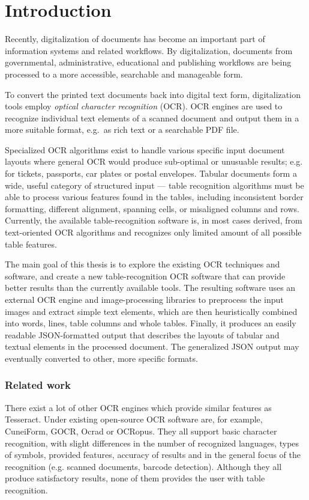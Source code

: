 \chapter*{Introduction}

Recently, digitalization of documents has become an important part of information systems and related workflows. By digitalization, documents from governmental, administrative, educational and publishing workflows are being processed to a more accessible, searchable and manageable form.

To convert the printed text documents back into digital text form, digitalization tools employ \emph{optical character recognition} (OCR). OCR engines are used to recognize individual text elements of a scanned document and output them in a more suitable format, e.g.~as rich text or a searchable PDF file.

Specialized OCR algorithms exist to handle various specific input document layouts where general OCR would produce sub-optimal or unusuable results; e.g. for tickets, passports, car plates or postal envelopes. Tabular documents form a wide, useful category of structured input --- table recognition algorithms must be able to process various features found in the tables, including inconsistent border formatting, different alignment, spanning cells, or misaligned columns and rows. Currently, the available table-recognition software is, in most cases derived, from text-oriented OCR algorithms and recognizes only limited amount of all possible table features.

The main goal of this thesis is to explore the existing OCR techniques and software, and create a new table-recognition OCR software that can provide better results than the currently available tools. The resulting software uses an external OCR engine and image-processing libraries to preprocess the input images and extract simple text elements, which are then heuristically combined into words, lines, table columns and whole tables. Finally, it produces an easily readable JSON-formatted output that describes the layouts of tabular and textual elements in the processed document. The generalized JSON output may eventually converted to other, more specific formats.

\subsection*{Related work}

There exist a lot of other OCR engines which provide similar features as Tesseract. Under existing open-source OCR software are, for example, CuneiForm, GOCR, Ocrad or OCRopus. They all support basic character recognition, with slight differences in the number of recognized languages, types of symbols, provided features, accuracy of results and in the general focus of the recognition (e.g. scanned documents, barcode detection). Although they all produce satisfactory results, none of them provides the user with table recognition.

